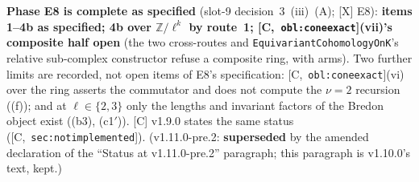 \documentclass[11pt]{article}
\theoremstyle{remark}
\newcommand{\Z}{\mathbb{Z}}
\newcommand{\HA}[1]{[C,~\texttt{#1}]}      %
\begin{document}
\textbf{Phase E8 is complete as specified} (slot-9 decision~3~(iii)~(A); [X] E8): \textbf{items
1--4b as specified; 4b over $\Z/\ell^k$ by route~1; \HA{obl:coneexact}(vii)'s composite half
open} (the two cross-routes and \texttt{EquivariantCohomologyOnK}'s relative sub-complex
constructor refuse a composite ring, with arms). Two further limits are recorded, not open items
of E8's specification: \HA{obl:coneexact}(vi) over the ring asserts the commutator and does not
compute the $\nu=2$ recursion ((f)); and at $\ell\in\{2,3\}$ only the lengths and invariant
factors of the Bredon object exist ((b3), (c1$'$)). [C] v1.9.0 states the same status
(\HA{sec:notimplemented}). (v1.11.0-pre.2: \textbf{superseded} by the amended declaration of the
``Status at v1.11.0-pre.2'' paragraph; this paragraph is v1.10.0's text, kept.)
\end{document}

